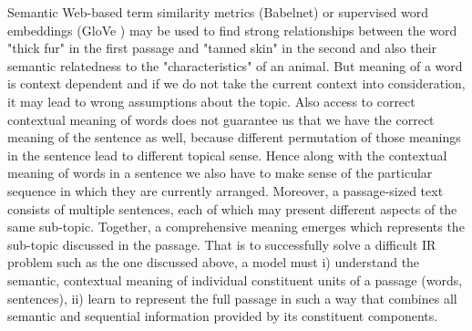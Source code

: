 Semantic Web-based term similarity metrics (Babelnet) or supervised word embeddings (GloVe ) may be used to find strong relationships between the word "thick fur" in the first passage and "tanned skin" in the second and also their semantic relatedness to the "characteristics" of an animal. But meaning of a word is context dependent and if we do not take the current context into consideration, it may lead to wrong assumptions about the topic. Also access to correct contextual meaning of words does not guarantee us that we have the correct meaning of the sentence as well, because different permutation of those meanings in the sentence lead to different topical sense. Hence along with the contextual meaning of words in a sentence we also have to make sense of the particular sequence in which they are currently arranged. Moreover, a passage-sized text consists of multiple sentences, each of which may present different aspects of the same sub-topic. Together, a comprehensive meaning emerges which represents the sub-topic discussed in the passage. That is to successfully solve a difficult IR problem such as the one discussed above, a model must i) understand the semantic, contextual meaning of individual constituent units of a passage (words, sentences), ii) learn to represent the full passage in such a way that combines all semantic and sequential information provided by its constituent components.

